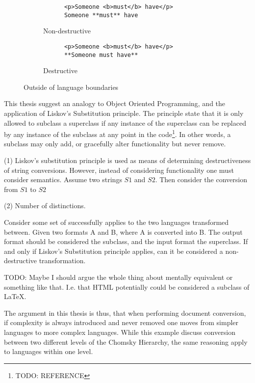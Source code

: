 \documentclass{scrreprt}
\begin{document}
\begin{figure}[h]
  \centering
  
  \begin{subfigure}{.5\textwidth}
    \begin{lstlisting}
      <p>Someone <b>must</b> have</p>
      Someone **must** have
    \end{lstlisting}

    \caption{Non-destructive}

  \end{subfigure}%
  \begin{subfigure}{.5\textwidth}

    \begin{lstlisting}
      <p>Someone <b>must</b> have</p>
      **Someone must have**
    \end{lstlisting}

    \caption{Destructive}
  \end{subfigure}

  \caption{Outside of language boundaries}
\end{figure}


This thesis suggest an analogy to Object Oriented Programming, and the application of Liskov's Substitution principle. The principle state that it is only allowed to subclass a superclass if any instance of the superclass can be replaced by any instance of the subclass at any point in the code\footnote{TODO: REFERENCE}. In other words, a subclass may only add, or gracefully alter functionality but never remove.

(1)
Liskov's substitution principle is used as means of determining destructiveness of string conversions. However, instead of considering functionality one must consider semantics. Assume two strings $S1$ and $S2$. Then consider the conversion from $S1$ to $S2$

(2) Number of distinctions.


Consider some set of  successfully applies to the two languages transformed between. Given two formats A and B, where A is converted into B. The output format should be considered the subclass, and the input format the superclass. If and only if Liskov's Substitution principle applies, can it be considered a non-destructive transformation.

TODO: Maybe I should argue the whole thing about mentally equivalent or something like that. I.e. that HTML potentially could be considered a subclass of \LaTeX.


The argument in this thesis is thus, that when performing document conversion, if complexity is always introduced and never removed one moves from simpler languages to more complex languages. While this example discuss conversion between two different levels of the Chomsky Hierarchy, the same reasoning apply to languages within one level.
\end{document}
